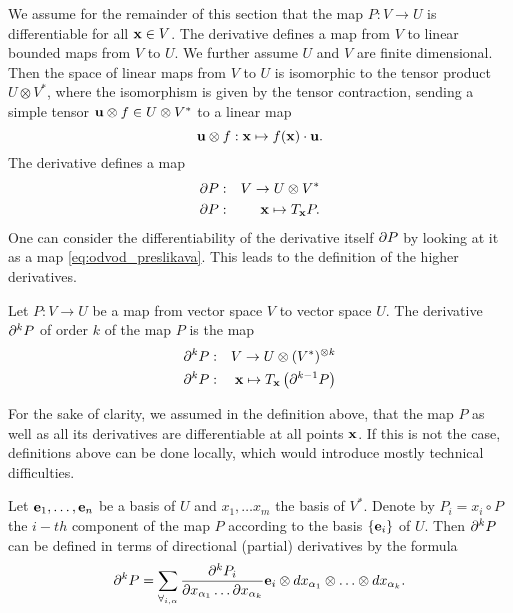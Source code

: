 We assume for the remainder of this section that the map $P:V\to U$ is
differentiable for all $\mathbf{x}\in V$. The derivative defines a map from $V$ to
linear bounded maps from $V$ to $U$. We further assume $U$ and $V$ are finite
dimensional. Then the space of linear maps from $V$ to $U$ is isomorphic to the
tensor product $U\otimes V^*$, where the isomorphism is given by the
tensor contraction, sending a simple tensor $\mathbf{u}\otimes f\in U\otimes
V^*$ to a linear map
 \begin{equation}
   \label{eq:lin_tenzor}
   \mathbf{u}\otimes f:\mathbf{x} \mapsto f(\mathbf{x})\cdot \mathbf{u}.
 \end{equation}
The derivative defines a map
\begin{eqnarray}
  \label{eq:odvod_preslikava}
  \partial P&:& V\to U\otimes V^*\\
  \partial P&:& \mathbf{x} \mapsto T_{\mathbf{x}} P.
\end{eqnarray}
One can consider the differentiability of the derivative itself $\partial P$ by
looking at it as a map \eqref{eq:odvod_preslikava}. This leads to the definition
of the higher derivatives.
\begin{definition}
  \label{def:higher_derivatives}
  Let $P:V\to U$ be a map from vector space $V$ to vector space $U$. 
The derivative $\partial^k P$ of order $k$ of the map $P$ is the map
\begin{eqnarray}\label{eq:partial}
    \label{eq:visji_odvod}
    \partial^kP&:&V\to U\otimes (V^*)^{\otimes k}\\
    \partial^kP&:&\mathbf{x}\mapsto T_{\mathbf{x}}\left( \partial^{k-1}P \right)
  \end{eqnarray}
\end{definition} 
\begin{remark}
  For the sake of clarity, we assumed in the definition above, that the map $P$
  as well as all its derivatives are differentiable at all points $\mathbf{x}$. If this
  is not the case, 
  definitions above can be done locally, which would introduce mostly technical
  difficulties. 
\end{remark}
Let $\mathbf{e}_1,\ldots,\mathbf{e}_n$ be a basis of $U$ and $x_1,\ldots x_m$ the basis of
$V^*$. Denote by $P_i=x_i\circ P$ the $i-th$ component of the map
$P$ according to the basis $\{\mathbf{e}_i\}$ of $U$.
Then $\partial^kP$  can be defined in terms of
directional (partial) derivatives by the formula
\begin{equation}\label{eq:d}
  \partial^kP=\sum_{\forall_{i,\alpha}}\frac{\partial^k P_i}{\partial
      x_{\alpha_1}\ldots \partial x_{\alpha_k}}\mathbf{e}_i\otimes
    dx_{\alpha_1}\otimes\ldots \otimes dx_{\alpha_k}.
\end{equation}

